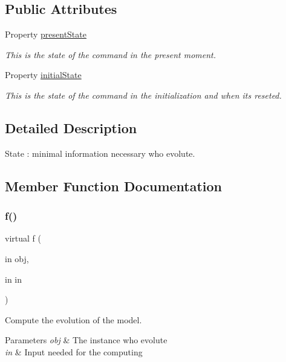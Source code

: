 \subsection*{Public Attributes}
\begin{DoxyCompactItemize}
\item 
Property \hyperlink{class_model_s_e_d_a9624cc7c421a50fa5086b0ebd0cd5fe3}{present\+State}
\begin{DoxyCompactList}\small\item\em This is the state of the command in the present moment. \end{DoxyCompactList}\item 
Property \hyperlink{class_model_s_e_d_acd9263acfa96c9138afdf497e55acc24}{initial\+State}
\begin{DoxyCompactList}\small\item\em This is the state of the command in the initialization and when it\textquotesingle{}s reseted. \end{DoxyCompactList}\end{DoxyCompactItemize}


\subsection{Detailed Description}
State \+: minimal information necessary who evolute. 

\subsection{Member Function Documentation}
\mbox{\label{class_model_s_e_d_ac36f9451c43b120828af4380858f2024}} 
\subsubsection{\texorpdfstring{f()}{f()}}
{\footnotesize\ttfamily virtual f (\begin{DoxyParamCaption}\item[{in}]{obj,  }\item[{in}]{in }\end{DoxyParamCaption})\hspace{0.3cm}{\ttfamily [virtual]}}



Compute the evolution of the model. 


\begin{DoxyParams}{Parameters}
{\em obj} & The instance who evolute \\
\hline
{\em in} & Input needed for the computing \\
\hline
\end{DoxyParams}

